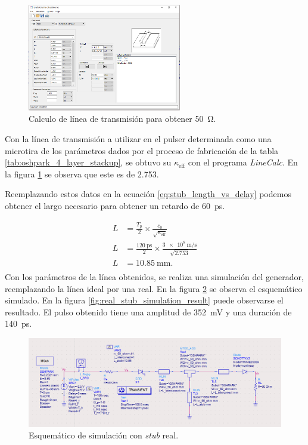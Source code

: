 \begin{figure}[tbp]
    \centering
    \includegraphics[width=0.6\textwidth]{images/tline_width_calculation.png}
    \caption{Calculo de línea de transmisión para obtener \qty{50}{\ohm}.}
    \label{fig:tline_width_calculation}
\end{figure}

Con la línea de transmisión a utilizar en el pulser determinada como una
microtira de los parámetros dados por el proceso de fabricación de la tabla
\ref{tab:oshpark_4_layer_stackup}, se obtuvo su $\kappa_{\text{eff}}$ con el
programa \textit{LineCalc}. En la figura \ref{fig:tline_width_calculation} se
observa que este es de \num{2.753}.

Reemplazando estos datos en la ecuación \ref{eq:stub_length_vs_delay} podemos
obtener el largo necesario para obtener un retardo de \qty{60}{\pico\second}.

\begin{equation}
    \begin{aligned}
        L &= \frac{T_p}{2} \times \frac{c_0}{\sqrt{\kappa_{\text{eff}}}} \\
        L &= \frac{\qty{120}{\pico\second}}{2} \times \frac{
            \qty{3e8}{\meter\per\second}}{\sqrt{2.753}} \\
        L &= \qty{10.85}{\milli\meter}. \\
    \end{aligned}
\end{equation}
Con los parámetros de la línea obtenidos, se realiza una simulación del
generador, reemplazando la línea ideal por una real. En la figura
\ref{fig:real_stub_simulation_sch} se observa el esquemático simulado. En la
figura \ref{fig:real_stub_simulation_result} puede observarse el resultado. El
pulso obtenido tiene una amplitud de \qty{352}{\milli\volt} y una duración de
\qty{140}{\pico\second}.

\begin{figure}[tbp]
    \centering
    \includegraphics[width=\textwidth]{images/real_stub_simulation_sch.png}
    \caption{Esquemático de simulación con \textit{stub} real.}
    \label{fig:real_stub_simulation_sch}
\end{figure}

